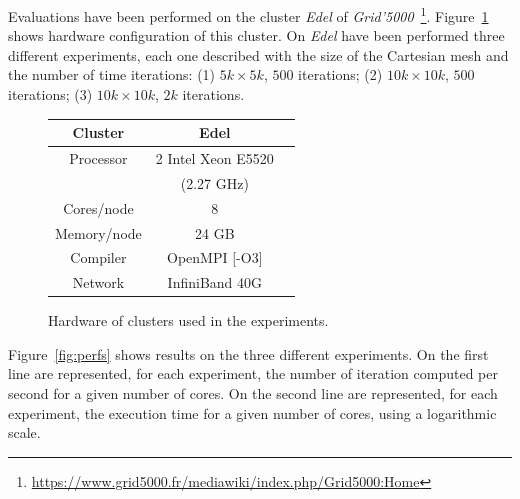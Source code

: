 Evaluations have been performed on the cluster \emph{Edel} of \emph{Grid'5000}~\footnote{\url{https://www.grid5000.fr/mediawiki/index.php/Grid5000:Home}}. Figure~\ref{tab:hard} shows hardware configuration of this cluster. On \emph{Edel} have been performed three different experiments, each one described with the size of the Cartesian mesh and the number of time iterations: (1) $5k \times 5k$, $500$ iterations; (2) $10k \times 10k$, $500$ iterations; (3) $10k \times 10k$, $2k$ iterations.

\begin{figure}[!h]
\begin{center}
 \begin{tabular}{|c|c|c|}
    \hline
    Cluster & \textbf{Edel}\\
    \hline         
    Processor & 2 Intel Xeon E5520\\
    & (2.27 GHz)\\
    Cores/node & 8 \\
    Memory/node & 24 GB \\
    Compiler & OpenMPI [-O3] \\
    Network & InfiniBand 40G\\
    \hline
 \end{tabular}
   \caption{\label{tab:hard}Hardware of clusters used in the experiments.}
 \end{center}
\end{figure}

Figure~\ref{fig:perfs} shows results on the three different experiments. On the first line are represented, for each experiment, the number of iteration computed per second for a given number of cores. On the second line are represented, for each experiment, the execution time  for a given number of cores, using a logarithmic scale.

